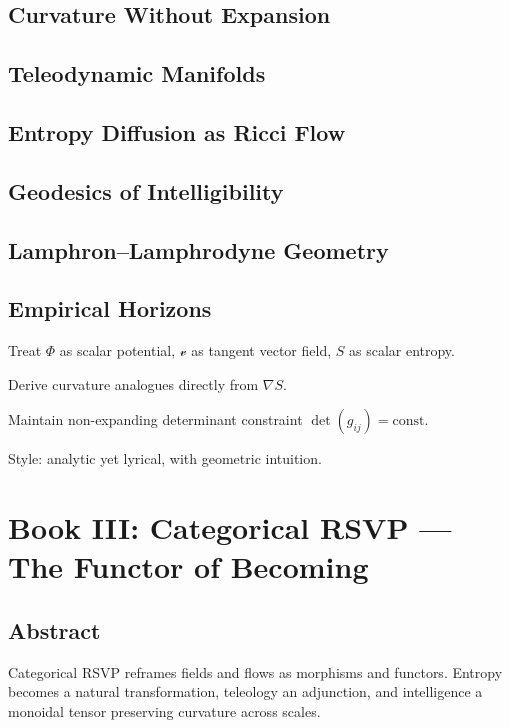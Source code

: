 \documentclass[12pt,oneside]{book}
\newcommand{\PhiField}{\ensuremath{\Phi}}
\newcommand{\vField}{\ensuremath{\boldsymbol{\mathcal{v}}}}
\newcommand{\SEntropy}{\ensuremath{S}}
\newcommand{\grad}{\nabla}
\begin{document}
\chapter{Curvature Without Expansion}
\chapter{Teleodynamic Manifolds}
\chapter{Entropy Diffusion as Ricci Flow}
\chapter{Geodesics of Intelligibility}
\chapter{Lamphron--Lamphrodyne Geometry}
\chapter{Empirical Horizons}

\begin{botinstructions}
  \item Treat $\PhiField$ as scalar potential, $\vField$ as tangent vector field, $\SEntropy$ as scalar entropy.
  \item Derive curvature analogues directly from $\grad \SEntropy$.
  \item Maintain non-expanding determinant constraint $\det(g_{ij})=\text{const}$.
  \item Style: analytic yet lyrical, with geometric intuition.
\end{botinstructions}

\part{Book III: Categorical RSVP — The Functor of Becoming}

\chapter*{Abstract}
Categorical RSVP reframes fields and flows as morphisms and functors.
Entropy becomes a natural transformation, teleology an adjunction,
and intelligence a monoidal tensor preserving curvature across scales.
\end{document}
